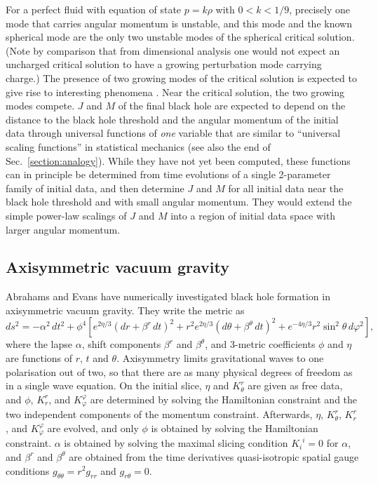 \documentclass{article}
\begin{document}
For a perfect fluid with equation of state $p=k\rho$ with $0<k<1/9$,
precisely one mode that carries angular momentum is unstable, and
this mode and the known spherical mode are the only two unstable modes
of the spherical critical solution. (Note by comparison that from
dimensional analysis one would not expect an uncharged critical
solution to have a growing perturbation mode carrying charge.)  The
presence of two growing modes of the critical solution is
expected to give rise to interesting phenomena
\cite{Gundlach_scalingfunctions}. Near the critical solution, the two
growing modes compete. $J$ and $M$ of the final black hole are
expected to depend on the distance to the black hole threshold and the
angular momentum of the initial data through universal functions of
{\em one} variable that are similar to ``universal scaling functions''
in statistical mechanics (see also the end of
Sec.~\ref{section:analogy}). While they have not yet been computed,
these functions can in principle be determined from time evolutions of
a single 2-parameter family of initial data, and then determine $J$
and $M$ for all initial data near the black hole threshold and with
small angular momentum. They would extend the simple power-law
scalings of $J$ and $M$ into a region of initial data space with
larger angular momentum.


\subsection{Axisymmetric vacuum gravity}
\label{section:brillwaves}

Abrahams and Evans \cite{AbrahamsEvans} have numerically investigated
black hole formation in axisymmetric vacuum gravity. They write
the metric as
\begin{equation}
\label{axisymmetric}
ds^2=-\alpha^2\,dt^2 + \phi^4\left[e^{2\eta/3}(dr+\beta^r\,dt)^2 +
r^2e^{2\eta/3}(d\theta+\beta^\theta\,dt)^2 +
e^{-4\eta/3}r^2\sin^2\theta\,d\varphi^2\right],
\end{equation}
where the lapse $\alpha$, shift components $\beta^r$ and
$\beta^\theta$, and 3-metric coefficients $\phi$ and $\eta$ are
functions of $r$, $t$ and $\theta$. Axisymmetry limits gravitational
waves to one polarisation out of two, so that there are as many
physical degrees of freedom as in a single wave equation. On the
initial slice, $\eta$ and $K^r_\theta$ are given as free data, and
$\phi$, $K^r_r$, and $K^\varphi_\varphi$ are determined by solving the
Hamiltonian constraint and the two independent components of the
momentum constraint. Afterwards, $\eta$, $K^r_\theta$, $K^r_r$, and
$K^\varphi_\varphi$ are evolved, and only $\phi$ is obtained by
solving the Hamiltonian constraint.  $\alpha$ is obtained by solving
the maximal slicing condition ${K_i}^i=0$ for $\alpha$, and $\beta^r$
and $\beta^\theta$ are obtained from the time derivatives
quasi-isotropic spatial gauge conditions $g_{\theta\theta}=r^2 g_{rr}$
and $g_{r\theta}=0$.
\end{document}
